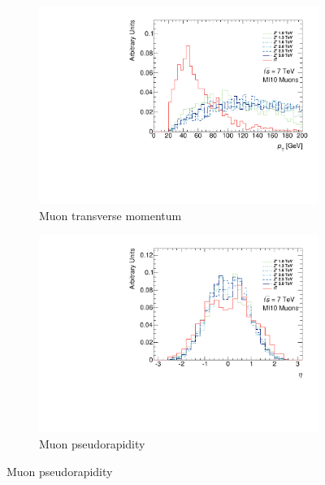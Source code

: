 \begin{figure}[htbp]
  \centering
  \begin{subfigure}{0.48\textwidth}
    \includegraphics[width=\textwidth]{PartBoosted/Plots/h_mi10_pt.pdf}
    \caption{Muon transverse momentum} \label{fig:BoostedControlMI10Pt}
  \end{subfigure}
  \begin{subfigure}{0.48\textwidth}
    \includegraphics[width=\textwidth]{PartBoosted/Plots/h_mi10_eta.pdf}
    \caption{Muon pseudorapidity} \label{fig:BoostedControlMI10Eta}
  \end{subfigure}


\end{figure}

